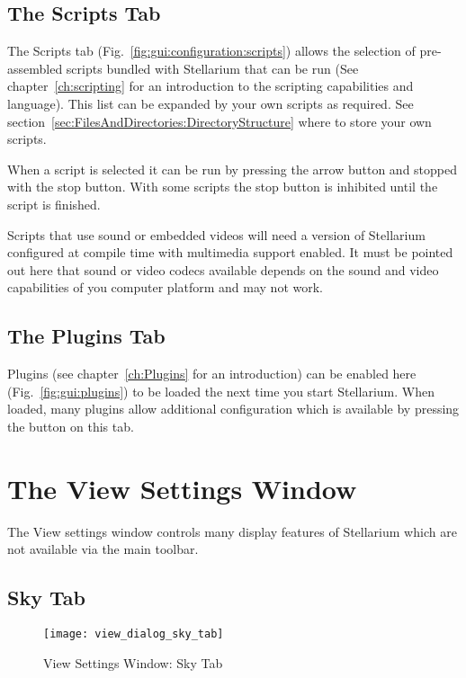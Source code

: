\subsection{The Scripts Tab}
\label{sec:gui:scripts}


The Scripts tab (Fig.~\ref{fig:gui:configuration:scripts}) allows the
selection of pre-assembled scripts bundled with Stellarium that can be
run (See chapter~\ref{ch:scripting} for an introduction to the
scripting capabilities and language). This list can be expanded by
your own scripts as required. See
section~\ref{sec:FilesAndDirectories:DirectoryStructure} where to
store your own scripts.

When a script is selected it can be run by pressing the arrow button
and stopped with the stop button. With some scripts the stop button is
inhibited until the script is finished. %

Scripts that use sound or embedded videos will need a version of
Stellarium configured at compile time with multimedia support
enabled. It must be pointed out here that sound or video codecs
available depends on the sound and video capabilities of you computer
platform and may not work.


\subsection{The Plugins Tab }
\label{sec:gui:configuration:plugins}


Plugins (see chapter~\ref{ch:Plugins} for an introduction) can be
enabled here (Fig.~\ref{fig:gui:plugins}) to be loaded the next time
you start Stellarium. When loaded, many plugins allow additional configuration
which is available by pressing the  button on this tab.




\section{The View Settings Window}
\label{sec:gui:view}

The View settings window controls many display features of Stellarium
which are not available via the main toolbar.

\subsection{Sky Tab}
\label{sec:gui:view:sky}

\begin{figure}[t]
\centering\texttt{[image: view\_dialog\_sky\_tab]}
\caption{View Settings Window: Sky Tab}
\label{fig:gui:view:sky}
\end{figure}

